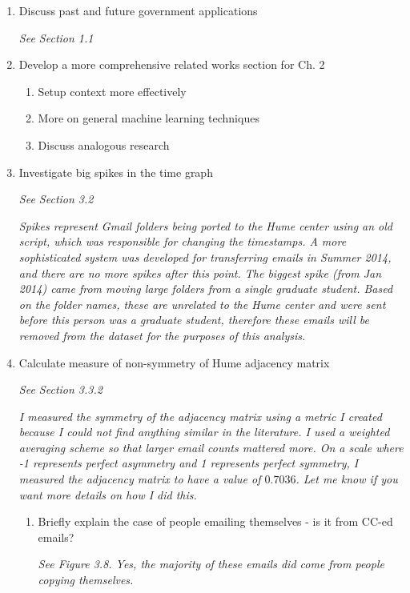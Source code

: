 \documentclass[12pt]{report}
\begin{document}
\begin{enumerate}
    \item Discuss past and future government applications
	\par \textit{See Section 1.1}

    \item Develop a more comprehensive related works section for Ch. 2
    \begin{enumerate}
        \item Setup context more effectively
        \item More on general machine learning techniques
        \item Discuss analogous research
    \end{enumerate}

    \item Investigate big spikes in the time graph
		\par \textit{See Section 3.2}
        \par \textit{Spikes represent Gmail folders being ported to the Hume center using an old script, which was responsible for changing the timestamps.  A more sophisticated system was developed for transferring emails in Summer 2014, and there are no more spikes after this point.  The biggest spike (from Jan 2014) came from moving large folders from a single graduate student.  Based on the folder names, these are unrelated to the Hume center and were sent before this person was a graduate student, therefore these emails will be removed from the dataset for the purposes of this analysis.}


	    \item Calculate measure of non-symmetry of Hume adjacency matrix
     	\par \textit{See Section 3.3.2}
	    \par \textit{I measured the symmetry of the adjacency matrix using a metric I created because I could not find anything similar 
	    	        in the literature.
			    	I used a weighted averaging scheme so that larger email counts mattered more.
	    	        On a scale where -1 represents perfect asymmetry and 1 represents perfect symmetry, I measured the adjacency matrix to have a value of $0.7036$.
	    	        Let me know if you want more details on how I did this.}
    \begin{enumerate}	    
		\item Briefly explain the case of people emailing themselves - is it from CC-ed emails?
		\par \textit{See Figure 3.8.  Yes, the majority of these emails did come from people copying themselves.}
	\end{enumerate}
	


\end{enumerate}
\end{document}
